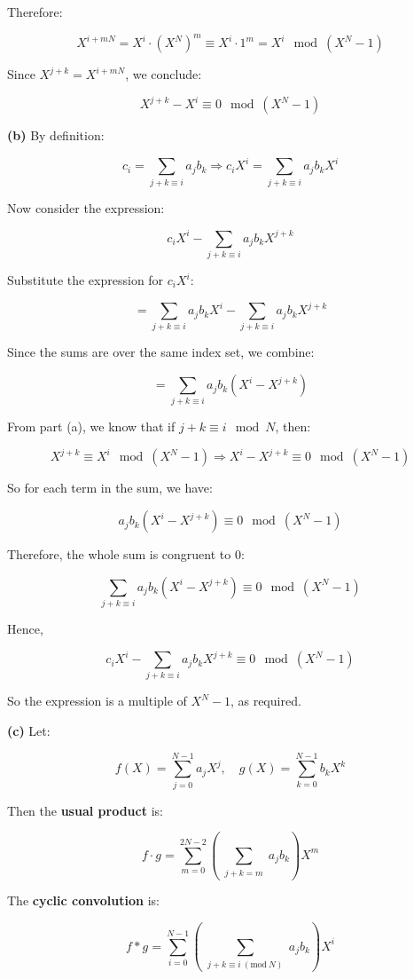 \documentclass[a4paper,12pt]{article}
\begin{document}
Therefore:

\[
X^{i + mN} = X^i \cdot (X^N)^m \equiv X^i \cdot 1^m = X^i \mod (X^N - 1)
\]

Since \(X^{j+k} = X^{i + mN}\), we conclude:

\[
X^{j+k} - X^i \equiv 0 \mod (X^N - 1)
\]

    \textbf{(b)} By definition:

\[
c_i = \sum_{j + k \equiv i} a_j b_k
\Rightarrow
c_i X^i = \sum_{j + k \equiv i} a_j b_k X^i
\]

Now consider the expression:

\[
c_i X^i - \sum_{j + k \equiv i} a_j b_k X^{j+k}
\]

Substitute the expression for \(c_i X^i\):

\[
= \sum_{j + k \equiv i} a_j b_k X^i - \sum_{j + k \equiv i} a_j b_k X^{j+k}
\]

Since the sums are over the same index set, we combine:

\[
= \sum_{j + k \equiv i} a_j b_k (X^i - X^{j+k})
\]

From part (a), we know that if \(j + k \equiv i \mod N\), then:

\[
X^{j+k} \equiv X^i \mod (X^N - 1)
\Rightarrow X^i - X^{j+k} \equiv 0 \mod (X^N - 1)
\]

So for each term in the sum, we have:

\[
a_j b_k (X^i - X^{j+k}) \equiv 0 \mod (X^N - 1)
\]

Therefore, the whole sum is congruent to 0:

\[
\sum_{j + k \equiv i} a_j b_k (X^i - X^{j+k}) \equiv 0 \mod (X^N - 1)
\]

Hence,

\[
c_i X^i - \sum_{j + k \equiv i} a_j b_k X^{j+k}
\equiv 0 \mod (X^N - 1)
\]

So the expression is a multiple of \(X^N - 1\), as required.

    \textbf{(c)} Let:

\[
f(X) = \sum_{j=0}^{N-1} a_j X^j, \quad
g(X) = \sum_{k=0}^{N-1} b_k X^k
\]

Then the \textbf{usual product} is:

\[
f \cdot g = \sum_{m=0}^{2N-2} \left( \sum_{\substack{j + k = m}} a_j b_k \right) X^m
\]

The \textbf{cyclic convolution} is:

\[
f * g = \sum_{i=0}^{N-1} \left( \sum_{\substack{j + k \equiv i \ (\mathrm{mod}\ N)}} a_j b_k \right) X^i
\]
\end{document}
